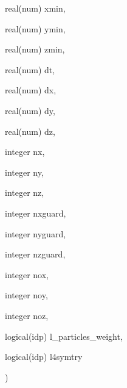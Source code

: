 {\begin{DoxyParamCaption}
\item[{real(num)}]{xmin, }
\item[{real(num)}]{ymin, }
\item[{real(num)}]{zmin, }
\item[{real(num)}]{dt, }
\item[{real(num)}]{dx, }
\item[{real(num)}]{dy, }
\item[{real(num)}]{dz, }
\item[{integer}]{nx, }
\item[{integer}]{ny, }
\item[{integer}]{nz, }
\item[{integer}]{nxguard, }
\item[{integer}]{nyguard, }
\item[{integer}]{nzguard, }
\item[{integer}]{nox, }
\item[{integer}]{noy, }
\item[{integer}]{noz, }
\item[{logical(idp)}]{l\+\_\+particles\+\_\+weight, }
\item[{logical(idp)}]{l4symtry}
\end{DoxyParamCaption}
)}\hypertarget{current__deposition_8_f90_a1b0279f68e8d25ed75dea74ec525c04b}{}\label{current__deposition_8_f90_a1b0279f68e8d25ed75dea74ec525c04b}
